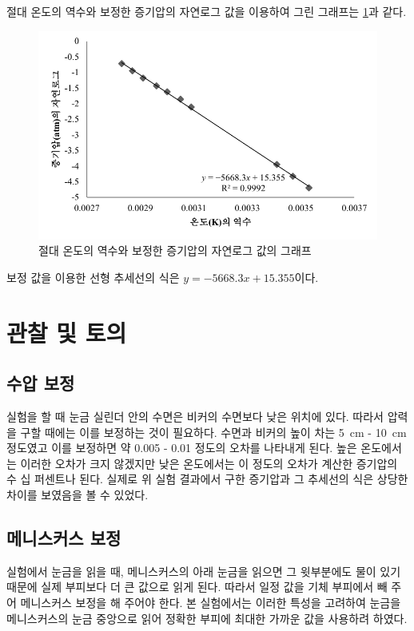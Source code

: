 \documentclass[a4paper,10pt]{article}
\begin{document}
	절대 온도의 역수와 보정한 증기압의 자연로그 값을 이용하여 그린 그래프는 \ref{exp_graph_2}과 같다.
	
	\begin{figure}[ht]
		\centering
		\includegraphics[scale=1]{Book3_2.pdf}
		\caption{절대 온도의 역수와 보정한 증기압의 자연로그 값의 그래프}
		\label{exp_graph_2}
	\end{figure}
	
	보정 값을 이용한 선형 추세선의 식은 $y = -5668.3x + 15.355$이다.
	
	\section{관찰 및 토의}
	
	\subsection{수압 보정}
	실험을 할 때 눈금 실린더 안의 수면은 비커의 수면보다 낮은 위치에 있다. 따라서 압력을 구할 때에는 이를 보정하는 것이 필요하다. 수면과 비커의 높이 차는 \SI{5}{\centi\metre} - \SI{10}{\centi\metre} 정도였고 이를 보정하면 약 \SI{0.005}{\atmosphere} - \SI{0.01}{\atmosphere} 정도의 오차를 나타내게 된다. 높은 온도에서는 이러한 오차가 크지 않겠지만 낮은 온도에서는 이 정도의 오차가 계산한 증기압의 수 십 퍼센트나 된다. 실제로 위 실험 결과에서 구한 증기압과 그 추세선의 식은 상당한 차이를 보였음을 볼 수 있었다.
	
	\subsection{메니스커스 보정}
	실험에서 눈금을 읽을 때, 메니스커스의 아래 눈금을 읽으면 그 윗부분에도 물이 있기 때문에 실제 부피보다 더 큰 값으로 읽게 된다. 따라서 일정 값을 기체 부피에서 빼 주어 메니스커스 보정을 해 주어야 한다. 본 실험에서는 이러한 특성을 고려하여 눈금을 메니스커스의 눈금 중앙으로 읽어 정확한 부피에 최대한 가까운 값을 사용하려 하였다.
	
\end{document}
